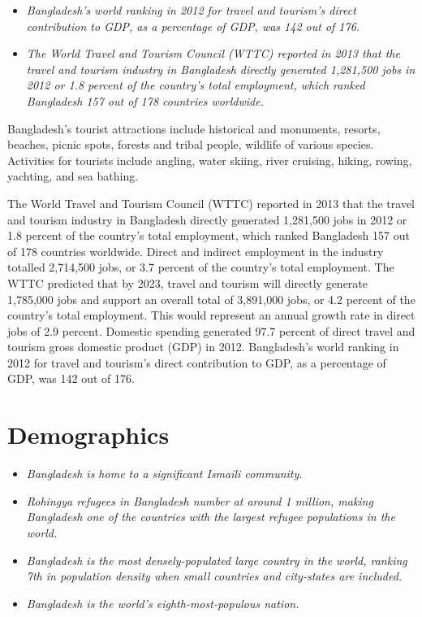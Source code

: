 \begin{itemize}
\item
  \emph{Bangladesh's world ranking in 2012 for travel and tourism's
  direct contribution to GDP, as a percentage of GDP, was 142 out of
  176.}
\item
  \emph{The World Travel and Tourism Council (WTTC) reported in 2013
  that the travel and tourism industry in Bangladesh directly generated
  1,281,500 jobs in 2012 or 1.8 percent of the country's total
  employment, which ranked Bangladesh 157 out of 178 countries
  worldwide.}
\end{itemize}

Bangladesh's tourist attractions include historical and monuments,
resorts, beaches, picnic spots, forests and tribal people, wildlife of
various species. Activities for tourists include angling, water skiing,
river cruising, hiking, rowing, yachting, and sea bathing.

The World Travel and Tourism Council (WTTC) reported in 2013 that the
travel and tourism industry in Bangladesh directly generated 1,281,500
jobs in 2012 or 1.8 percent of the country's total employment, which
ranked Bangladesh 157 out of 178 countries worldwide. Direct and
indirect employment in the industry totalled 2,714,500 jobs, or 3.7
percent of the country's total employment. The WTTC predicted that by
2023, travel and tourism will directly generate 1,785,000 jobs and
support an overall total of 3,891,000 jobs, or 4.2 percent of the
country's total employment. This would represent an annual growth rate
in direct jobs of 2.9 percent. Domestic spending generated 97.7 percent
of direct travel and tourism gross domestic product (GDP) in 2012.
Bangladesh's world ranking in 2012 for travel and tourism's direct
contribution to GDP, as a percentage of GDP, was 142 out of 176.

\section{Demographics}\label{demographics}

\begin{itemize}
\item
  \emph{Bangladesh is home to a significant Ismaili community.}
\item
  \emph{Rohingya refugees in Bangladesh number at around 1 million,
  making Bangladesh one of the countries with the largest refugee
  populations in the world.}
\item
  \emph{Bangladesh is the most densely-populated large country in the
  world, ranking 7th in population density when small countries and
  city-states are included.}
\item
  \emph{Bangladesh is the world's eighth-most-populous nation.}
\end{itemize}

